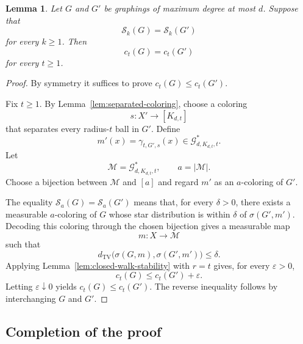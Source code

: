 \documentclass[11pt]{amsart}
\newcommand{\calG}{\mathcal G}
\newcommand{\calS}{\mathcal S}
\newcommand{\TV}{\operatorname{TV}}
\newtheorem{lemma}[theorem]{Lemma}
\theoremstyle{remark}
\begin{document}
\begin{lemma}\label{lem:closed-walks-equal}
Let $G$ and $G'$ be graphings of maximum degree at most $d$.  Suppose that
\[
 \calS_k(G)=\calS_k(G')
\]
for every $k\geq 1$.  Then
\[
 c_t(G)=c_t(G')
\]
for every $t\geq 1$.
\end{lemma}

\begin{proof}
By symmetry it suffices to prove $c_t(G)\leq c_t(G')$.

Fix $t\geq1$.  By Lemma~\ref{lem:separated-coloring}, choose a coloring
\[
 s\colon X'\to[K_{d,t}]
\]
that separates every radius-$t$ ball in $G'$.  Define
\[
 m'(x)=\gamma_{t,G',s}(x)\in\calG^*_{d,K_{d,t},t}.
\]
Let
\[
 \mathcal M=\calG^*_{d,K_{d,t},t},\qquad a=|\mathcal M|.
\]
Choose a bijection between $\mathcal M$ and $[a]$ and regard $m'$ as an $a$-coloring of $G'$.

The equality $\calS_a(G)=\calS_a(G')$ means that, for every $\delta>0$, there exists a measurable $a$-coloring of $G$ whose star distribution is within $\delta$ of $\sigma(G',m')$.  Decoding this coloring through the chosen bijection gives a measurable map
\[
 m\colon X\to\mathcal M
\]
such that
\[
 d_{\TV}\bigl(\sigma(G,m),\sigma(G',m')\bigr)\leq\delta.
\]
Applying Lemma~\ref{lem:closed-walk-stability} with $r=t$ gives, for every $\varepsilon>0$,
\[
 c_t(G)\leq c_t(G')+\varepsilon.
\]
Letting $\varepsilon\downarrow 0$ yields $c_t(G)\leq c_t(G')$.  The reverse inequality follows by interchanging $G$ and $G'$.
\end{proof}

\subsection{Completion of the proof}
\end{document}
